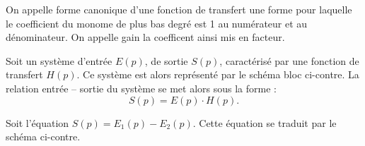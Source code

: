 \vspace{1cm}

\begin{defi}
On appelle forme canonique d'une fonction de transfert une forme pour laquelle le coefficient du monome de plus bas degré est 1 au numérateur et au dénominateur. On appelle gain la coefficent ainsi mis en facteur.  
\end{defi}


\vspace{2cm}

\begin{marginfigure}[1cm]
\centering
{} 
\end{marginfigure}

\begin{defi}

Soit un système d'entrée $E(p)$, de sortie $S(p)$, caractérisé par une fonction
de transfert $H(p)$. Ce système est alors représenté par le schéma bloc ci-contre.
La relation entrée -- sortie du système se met alors sous la forme : 
$$
S(p) = E(p) \cdot H(p).
$$
\end{defi}



\begin{marginfigure}[1cm]
\end{marginfigure}

\vspace{1cm}

\begin{defi}
Soit l'équation $S(p)=E_1(p)-E_2(p)$. Cette équation se traduit par le schéma ci-contre.
\end{defi}



